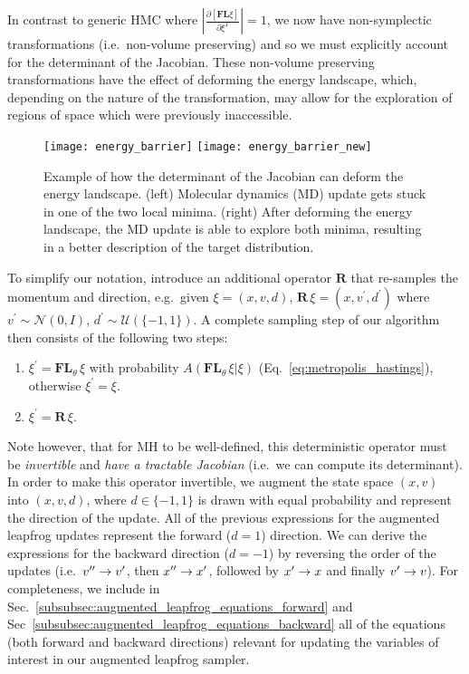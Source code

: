 \documentclass[../main.tex]{subfiles}
\begin{document}
In contrast to generic HMC where $\left|\frac{\partial\left[\mathbf{F}\mathbf{L}\xi\right]} {\partial\xi^{T}}\right| =
1$, we now have non-symplectic transformations (i.e.\ non-volume preserving) and so we must explicitly account for the
determinant of the Jacobian.
%
These non-volume preserving transformations have the effect of deforming the energy landscape, which, depending on the
nature of the transformation, may allow for the exploration of regions of space which were previously inaccessible.
%
\begin{figure}[htpb]
    \centering
    \texttt{[image: energy\_barrier]}
    \texttt{[image: energy\_barrier\_new]}
    \caption{Example of how the determinant of the Jacobian can deform the
      energy landscape. (left) Molecular dynamics (MD) update gets stuck in
      one of the two local minima. (right) After deforming the energy
      landscape, the MD update is able to explore both minima, resulting in a
      better description of the target 
      distribution.}\label{fig:energy_barrier}
\end{figure}
%
To simplify our notation, introduce an additional operator $\mathbf{R}$ that re-samples the momentum and direction,
e.g.\ given $\xi = (x, v, d)$, $\mathbf{R}\,\xi = (x, v^{\prime}, d^{\prime})$ where $v^{\prime} \sim \mathcal{N}(0,
I)$, $d^{\prime} \sim \mathcal{U}\left(\{-1, 1\}\right)$.
%
A complete sampling step of our algorithm then consists of the following two steps:
%
\begin{enumerate}
    \item $\xi^{\prime} = \mathbf{FL}_{\theta} \,\xi$ with probability
        $A(\mathbf{FL}_{\theta}\,\xi|\xi)$ (Eq.~\ref{eq:metropolis_hastings}),
        otherwise $\xi^{\prime} = \xi$.
    \item $\xi^{\prime} = \mathbf{R}\,\xi$.
\end{enumerate}
%
Note however, that for MH to be well-defined, this deterministic operator must be \emph{invertible} and \emph{have a
tractable Jacobian} (i.e.\ we can compute its determinant).
%
In order to make this operator invertible, we augment the state space $(x, v)$ into $(x, v, d)$, where $d \in \{-1,
1\}$ is drawn with equal probability and represent the direction of the update.
%
All of the previous expressions for the augmented leapfrog updates represent the forward ($d = 1$) direction.
%
We can derive the expressions for the backward direction ($d = -1$) by reversing the order of the updates (i.e.\ ${v^{\prime\prime}}
\rightarrow {v^{\prime}}$, then ${x^{\prime\prime}} \rightarrow {x^{\prime}}$, followed by ${x^{\prime}} \rightarrow x$ and finally ${v^{\prime}} \rightarrow v$).
%
For completeness, we include in Sec.~\ref{subsubsec:augmented_leapfrog_equations_forward} and
Sec~\ref{subsubsec:augmented_leapfrog_equations_backward} all of the equations (both forward and backward directions)
relevant for updating the variables of interest in our augmented leapfrog sampler.
%
\clearpage
%
\end{document}
